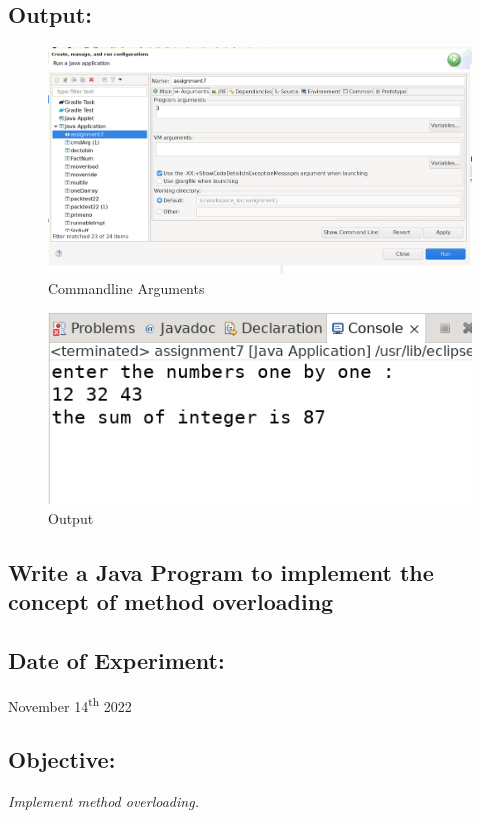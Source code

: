 \documentclass[12pt, a4paper]{article}
\begin{document}
\subsection*{Output:}
\setcounter{figure}{0}
\begin{figure}[h]
  \centering
  \includegraphics[width=\textwidth]{assign71}
  \caption{Commandline Arguments}
\end{figure}
\begin{figure}[h]
  \centering
  \includegraphics[width=\textwidth]{assign72}
  \caption{Output}
\end{figure}
\newpage

\begin{tcolorbox}
\section{Write a Java Program to implement the concept of method overloading}
\end{tcolorbox}

\subsection*{Date of Experiment:}
November 14\textsuperscript{th} 2022
\subsection*{Objective:}
\emph{\large{Implement method overloading.}}
\end{document}
